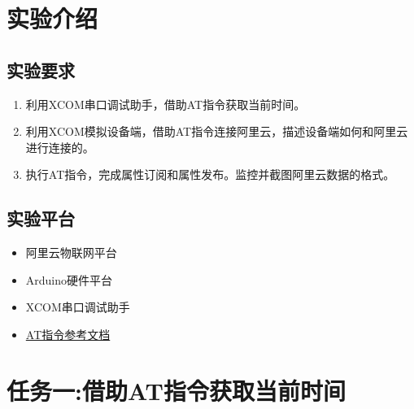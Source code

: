 \documentclass[12pt,hyperref,a4paper,UTF8]{ctexart}
\begin{document}
\cover

%
%

\thispagestyle{empty} %

\newpage
\tableofcontents

\newpage


\section{实验介绍}
\subsection{实验要求}

\begin{enumerate}[itemsep=-5pt, topsep=0pt, partopsep=0pt]
    \item 利用XCOM串口调试助手，借助AT指令获取当前时间。
    \item 利用XCOM模拟设备端，借助AT指令连接阿里云，描述设备端如何和阿里云进行连接的。
    \item 执行AT指令，完成属性订阅和属性发布。监控并截图阿里云数据的格式。
\end{enumerate}
\subsection{实验平台}
\begin{itemize}[itemsep=-5pt, topsep=0pt, partopsep=0pt]
    \item 阿里云物联网平台
    \item Arduino硬件平台
    \item XCOM串口调试助手
    \item \href{https://help.aliyun.com/document_detail/73742.html?spm=a2c4g.11186623.6.540.3f7e3e3b3z3z3z}{AT指令参考文档}
\end{itemize}


\section{任务一:借助AT指令获取当前时间}
\end{document}

